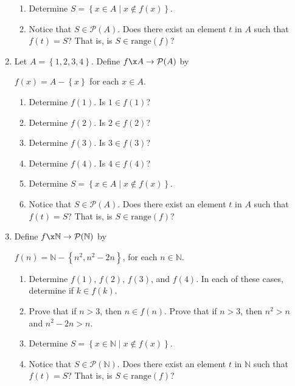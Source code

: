 \begin{previewactivity}
\begin{enumerate}
\begin{enumerate}
\item Determine $S = \left\{ x \in A \mid x \notin f ( x ) \right\}$.

\item Notice that $S \in \mathcal{P} ( A )$.  Does there exist an element $t$ in $A$ such that $f ( t ) = S$?  That is, is $S \in \text{range} ( f )$?
 
\end{enumerate}

\item Let $A = \left\{1, 2, 3, 4 \right\}$.  Define $f\x A \to \mathcal{P} ( A )$ by 
%
\begin{center}
$f ( x ) = A - \left\{ x \right\}$ for each $x \in A$.
\end{center}
%
\begin{multicols}{2}
\begin{enumerate}
\item Determine $f ( 1 )$.  Is $1 \in f ( 1 )$?
\item Determine $f ( 2 )$.  Is $2 \in f ( 2 )$?
\item Determine $f ( 3 )$.  Is $3 \in f ( 3 )$?
\item Determine $f ( 4 )$.  Is $4 \in f ( 4 )$?
\end{enumerate}
\end{multicols}
%
\begin{enumerate} \setcounter{enumii}{4}
\item Determine $S = \left\{ x \in A \mid x \notin f ( x ) \right\}$.

\item Notice that $S \in \mathcal{P} ( A )$.  Does there exist an element $t$ in $A$ such that $f ( t ) = S$?  That is, is $S \in \text{range} ( f )$?
\end{enumerate}
%
\item Define $f\x \mathbb{N} \to \mathcal{P} ( \mathbb{N} )$ by
%
\begin{center}
$f ( n ) = \mathbb{N} - \left\{n^2, n^2-2n \right\}$, for each $n \in \mathbb{N}$.
\end{center}
%
\begin{enumerate}
\item Determine $f ( 1 )$, $f ( 2 )$, $f ( 3 )$, and 
$f ( 4 )$.  In each of these cases, determine if $k \in f ( k )$.
%
\item Prove that if $n > 3$, then $n \in f ( n )$.  \hint  Prove that if $n >3$, then 
$n^2 > n$ and $n^2 - 2n >n$.

\item Determine $S = \left\{ x \in \mathbb{N} \mid x \notin f ( x ) \right\}$.

\item Notice that $S \in \mathcal{P} ( \mathbb{N} )$.  Does there exist an element $t$ in $\mathbb{N}$ such that $f ( t ) = S$?  That is, is 
$S \in \text{range} ( f )$?

\end{enumerate}
\end{enumerate}
\end{previewactivity}

\endinput


